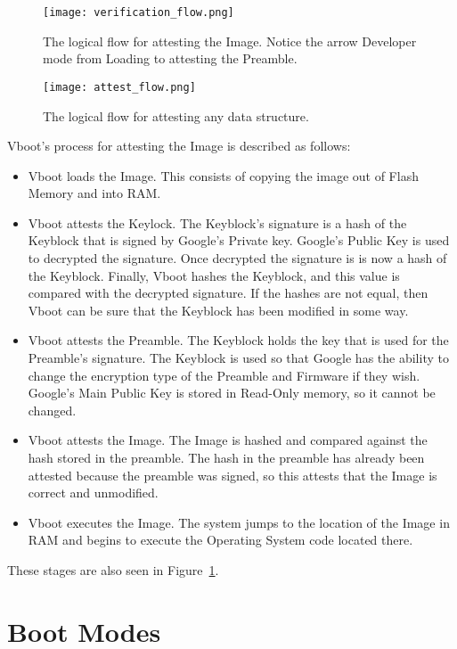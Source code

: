 \begin{figure}
  \centering
  \texttt{[image: verification\_flow.png]}
  \caption[Verified Boot Program Flow]{The logical flow for attesting the Image. Notice
  the arrow Developer mode from Loading to attesting the Preamble.}\label{fig:verif_flow}
\end{figure}
\begin{figure}
  \centering
  \texttt{[image: attest\_flow.png]}
  \caption[General Attest Flow]{The logical flow for attesting any data
      structure.}\label{fig:attest_flow}
\end{figure}

Vboot's process for attesting the Image is described as follows:
\begin{itemize}
    \item  Vboot loads the Image. This consists of copying the image out of Flash Memory and into RAM.
    \item  Vboot attests the Keylock. The Keyblock's signature is a hash of the Keyblock that is signed by Google's Private key.
Google's Public Key is used to decrypted the signature.
Once decrypted the signature is is now a hash of the Keyblock.
Finally, Vboot hashes the Keyblock, and this value is compared with the
decrypted signature.
If the hashes are not equal, then Vboot can be sure that the Keyblock has been
modified in some way. 
    \item Vboot attests the Preamble.
The Keyblock holds the key that is used for the Preamble's signature.
The Keyblock is used so that Google has the ability to change the encryption
type of the Preamble and Firmware if they wish.
Google's Main Public Key is stored in Read-Only memory, so it cannot be changed.
    \item Vboot attests the Image.
The Image is hashed and compared against the hash stored in the preamble.
The hash in the preamble has already been attested because the preamble was
signed, so this attests that the Image is correct and unmodified. 
    \item Vboot executes the Image.
The system jumps to the location of the Image in RAM and begins to execute the Operating System code located there.
\end{itemize}

These stages are also seen in Figure~\ref{fig:verif_flow}.

\section{Boot Modes}\label{sec:boot-modes}

